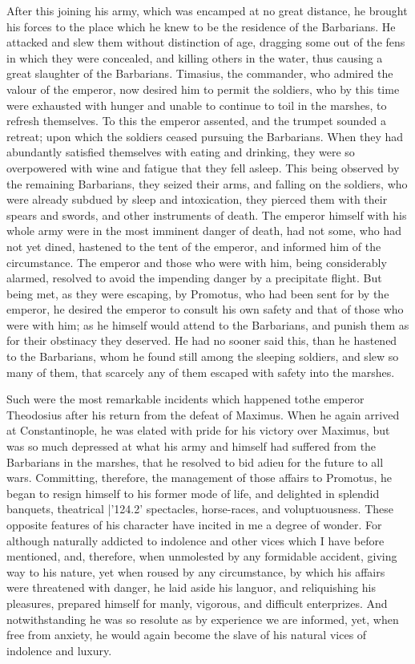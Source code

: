 After this joining his army, which was encamped at no great distance, he brought his forces to the place which he knew to be the residence of the Barbarians. He attacked and slew them without distinction of age, dragging some out of the fens in which they were concealed, and killing others in the water, thus causing a great slaughter of the Barbarians. Timasius, the commander, who admired the valour of the emperor, now desired him to permit the soldiers, who by this time were exhausted with hunger and unable to continue to toil in the marshes, to refresh themselves. To this the emperor assented, and the trumpet sounded a retreat; upon which the soldiers ceased pursuing the Barbarians. When they had abundantly satisfied themselves with eating and drinking, they were so overpowered with wine and fatigue that they fell asleep. This being observed by the remaining Barbarians, they seized their arms, and falling on the soldiers, who were already subdued by sleep and intoxication, they pierced them with their spears and swords, and other instruments of death. The emperor himself with his whole army were in the most imminent danger of death, had not some, who had not yet dined, hastened to the tent of the emperor, and informed him of the circumstance. The emperor and those who were with him, being considerably alarmed, resolved to avoid the impending danger by a precipitate flight. But being met, as they were escaping, by Promotus, who had been sent for by the emperor, he desired the emperor to consult his own safety and that of those who were with him; as he himself would attend to the Barbarians, and punish them as for their obstinacy they deserved. He had no sooner said this, than he hastened to the Barbarians, whom he found still among the sleeping soldiers, and slew so many of them, that scarcely any of them escaped with safety into the marshes.

Such were the most remarkable incidents which happened to\emph{}the emperor Theodosius after his return from the defeat of Maximus. When he again arrived at Constantinople, he was elated with pride for his victory over Maximus, but was so much depressed at what his army and himself had suffered from the Barbarians in the marshes, that he resolved to bid adieu for the future to all wars. Committing, therefore, the management of those affairs to Promotus, he began to resign himself to his former mode of life, and delighted in splendid banquets, theatrical
|'124.2' spectacles, horse-races, and
voluptuousness. These opposite features of his character have incited in
me a degree of wonder. For although naturally addicted to indolence and
other vices which I have before mentioned, and, therefore, when unmolested by
any formidable accident, giving way to his nature, yet when roused by any
circumstance, by which his affairs were threatened with danger, he laid aside
his languor, and reliquishing his pleasures, prepared himself for manly,
vigorous, and difficult enterprizes. And notwithstanding he was so
resolute as by experience we are informed, yet, when free from anxiety, he would
again become the slave of his natural vices of indolence and luxury.

